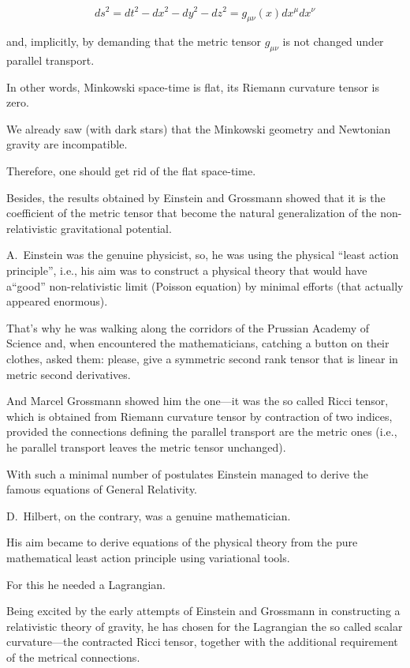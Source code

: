 $$ds^2 = dt^2 - dx^2 - dy^2 - dz^2 = g_{\mu \nu} (x) dx^{\mu} dx^{\nu}$$ 

and, implicitly, by demanding that the metric tensor $g_{\mu \nu}$ is not changed under parallel  transport. 

In other words, Minkowski space-time is flat, its Riemann curvature tensor is zero. 

We already saw (with dark stars) that the Minkowski geometry and Newtonian gravity are incompatible. 

Therefore, one should get rid of the flat space-time. 

Besides, the results obtained by Einstein and Grossmann showed that it is the coefficient of the metric tensor that become the natural generalization of the non-relativistic gravitational potential. 

A.~Einstein was the genuine physicist, so, he was using the physical ``least action principle'', i.e., his aim was to construct a physical theory that would have a``good'' non-relativistic limit (Poisson equation) by minimal efforts (that actually appeared enormous). 

That's why he was walking along the corridors of the Prussian Academy of Science and, when encountered the mathematicians, catching a button on their clothes, asked them: please, give a symmetric second rank tensor that is linear in metric second derivatives. 

And Marcel Grossmann showed him the one---it was the so called Ricci tensor, which is obtained from Riemann curvature tensor by contraction of two indices, provided the connections defining the parallel transport are the metric ones (i.e., he parallel transport leaves the metric tensor unchanged). 

With such a minimal number of postulates Einstein managed to derive the famous equations of General Relativity.  

D.~Hilbert, on the contrary, was a genuine mathematician. 

His aim became to derive equations of the physical theory from the pure mathematical least action principle using variational tools. 

For this he needed a Lagrangian. 

Being excited by the early attempts of Einstein and Grossmann in constructing a relativistic theory of gravity, he has chosen for the Lagrangian the so called scalar curvature---the contracted Ricci tensor, together with the additional requirement of the metrical connections. 

